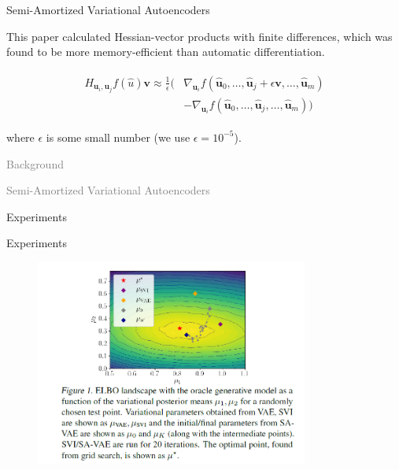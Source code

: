 \documentclass{beamer}		%
\newcommand{\light}[1]{\textcolor{gray}{#1}}
\begin{document}
\begin{frame}{Semi-Amortized Variational Autoencoders}

This paper calculated Hessian-vector products with finite differences, which was found to be more memory-efficient than automatic differentiation.

\begin{eqnarray*}
\begin{aligned}
H_{\bm{u}_i,\bm{u}_j}f(\hat{u})\bm{v} \approx \frac{1}{\epsilon} ( &\nabla_{\bm{u}_i}f(\hat{\bm{u}}_0,\ldots,\hat{\bm{u}}_j+\epsilon \bm{v}, \ldots, \hat{\bm{u}}_m)\\
&- \nabla_{\bm{u}_i} f(\hat{\bm{u}}_0,\ldots,\hat{\bm{u}}_j,\ldots,\hat{\bm{u}}_m ) )
\end{aligned}    
\end{eqnarray*}

where $\epsilon$ is some small number (we use $\epsilon = 10^{-5}$).

\end{frame}



\begin{frame}[noframenumbering]
\begin{itemize}
    \begin{LARGE}
    \item \light{Background}
    \item \light{Semi-Amortized Variational Autoencoders}
    \item Experiments
    \end{LARGE}
\end{itemize}
\end{frame}



\begin{frame}{Experiments}

\begin{figure}[t]
\includegraphics[width=0.8\textwidth]{figure6.png}
\label{fig1}
\end{figure}

\end{frame}
\end{document}
